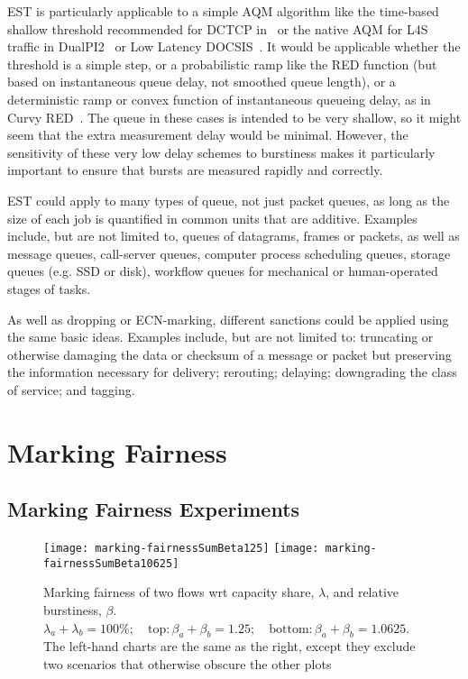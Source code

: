 EST is particularly applicable to a simple AQM algorithm like the time-based shallow threshold recommended for DCTCP in~\cite{Bai16:MQ-ECN} or the native AQM for L4S traffic in DualPI2~\cite[Appx.\ A]{Briscoe15e:DualQ-Coupled-AQM_ID} or Low Latency DOCSIS~\cite{CableLabs:DOCSIS3.1}. It would be applicable whether the threshold is a simple step, or a probabilistic ramp like the RED function (but based on instantaneous queue delay, not smoothed queue length), or a deterministic ramp or convex function of instantaneous queueing delay, as in Curvy RED~\cite[Appx.\ B]{Briscoe15e:DualQ-Coupled-AQM_ID}. The queue in these cases is intended to be very shallow, so it might seem that the extra measurement delay would be minimal. However, the sensitivity of these very low delay schemes to burstiness makes it particularly important to ensure that bursts are measured rapidly and correctly.

EST could apply to many types of queue, not just packet queues, as long as the size of each job is quantified in common units that are additive. Examples include, but are not limited to, queues of datagrams, frames or packets, as well as message queues, call-server queues, computer process scheduling queues, storage queues (e.g. SSD or disk), workflow queues for mechanical or human-operated stages of tasks. 

As well as dropping or ECN-marking, different sanctions could be applied using the same basic ideas. Examples include, but are not limited to: truncating or otherwise damaging the data or checksum of a message or packet but preserving the information necessary for delivery; rerouting; delaying; downgrading the class of service; and tagging.

\section{Marking Fairness}\label{sec:marking_fairness_discuss}

\subsection{Marking Fairness Experiments}\label{sec:marking_fairness_expts}


\begin{figure*}[t!]
	\centering
	\texttt{[image: marking-fairnessSumBeta125]}
	\texttt{[image: marking-fairnessSumBeta10625]}
	\caption{Marking fairness of two flows wrt capacity share, \(\lambda\), and relative burstiness, \(\beta\).\\
	\(\lambda_a+\lambda_b=100\%; \quad\mathrm{top:} \beta_a+\beta_b=1.25; \quad\mathrm{bottom:} \beta_a+\beta_b=1.0625\). 
	The left-hand charts are the same as the right, except they exclude two scenarios that otherwise obscure the other plots}\label{fig:marking-fairness-range}
\end{figure*}

